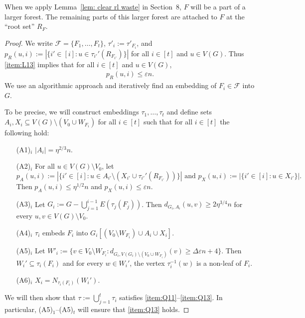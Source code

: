 \documentclass[a4paper, 11pt, reqno]{amsart}
\numberwithin{equation}{section}
\newcommand{\1}{{\rm 1\hspace*{-0.4ex}%
\rule{0.1ex}{1.52ex}\hspace*{0.2ex}}}
\newcommand{\cF}{\mathcal{F}}
\renewcommand{\epsilon}{\varepsilon}
\newcommand{\sm}{\setminus}
\newcommand{\sub}{\subseteq}
\begin{document}
When we apply Lemma~\ref{lem: clear rl waste} in Section~8, $F$ will be a part of a larger forest. The remaining parts of this larger forest are attached to $F$ at the ``root set'' $R_F$.
\begin{proof}
We write $\cF =\{F_1,\dots, F_{t}\}$, 
$\tau'_i:= \tau'_{F_i}$,
and $p_R(u,i):=|\{i'\in[i]:u\in \tau_{i'}'(R_{F_{i'}})\}|$ for all $i\in [t]$ and $u\in V(G)$. 
Thus \ref{item:L13} implies that for all $i\in [t]$ and $u\in V(G)$, 
\begin{align}\label{eq: pr en}
p_R(u,i)\leq \epsilon n.
\end{align}
We use an algorithmic approach and iteratively find an embedding of $F_i\in \cF$ into $G$.

To be precise, we will construct embeddings $\tau_1,\dots, \tau_{t}$
and define sets $A_i,X_i\sub V(G)\sm (V_0 \cup W_{F_i})$ for all $i\in [t]$
such that for all $i\in [t]$ the following hold:
\begin{itemize}
\item[(A1)$_i$] $|A_i| =\eta^{2/3}n$.
\item[(A2)$_i$] For all $u\in V(G)\setminus V_0$, let 
$$p_A(u,i) := |\{i'\in[i]: u\in A_{i'}\sm (X_{i'}\cup\tau_{i'}'( R_{F_{i'}}))\}| \text{ and } p_X(u,i) := |\{i'\in[i]: u\in X_{i'}\}|.$$
Then $p_A(u,i)\leq \eta^{1/2}n$ and $p_X(u,i)\leq \epsilon n$. 

\item[(A3)$_i$] Let $G_{i}:= G- \bigcup_{j=1}^{i-1}E(\tau_{j}(F_{j}))$. Then
$d_{G_i,A_i}(u,v)  \geq 2\eta^{3/4} n$ for every $u,v\in V(G)\setminus V_0$.
\item[(A4)$_i$]$\tau_{i}$ embeds $F_i$ into $G_i[(V_0 \sm W_{F_i}) \cup A_i \cup X_i ]$.
\item[(A5)$_i$] Let $W'_i:= \{v\in V_0\setminus W_{F_i}: d_{G_i, V(G_i)\setminus(V_0 \cup W_{F_i})}(v) \geq \Delta \epsilon n +4\}$.
Then $W_i'\sub \tau_i(F_i)$ and for every $w\in W_i'$,
the vertex $\tau_i^{-1}(w)$ is a non-leaf of $F_i$.
\item[(A6)$_i$] $X_i=N_{\tau_i(F_i)}(W_i')$.
\end{itemize}
We will then show that $\tau:=\bigcup_{j=1}^t\tau_i$ satisfies \ref{item:Q11}--\ref{item:Q13}.
In particular, (A5)$_1$--(A5)$_t$ will ensure that \ref{item:Q13} holds.


\end{proof}
\end{document}
